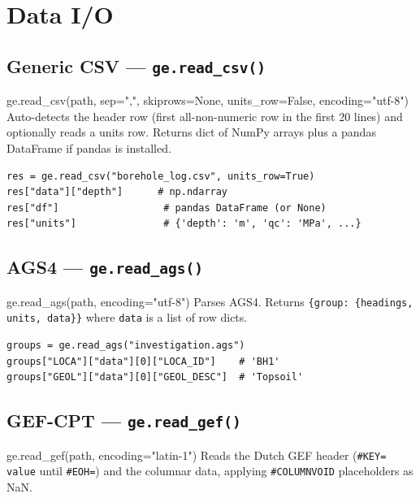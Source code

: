 \documentclass[11pt,a4paper,openany]{book}
\begin{document}
\chapter{Data I/O}\label{ch:io}

\section{Generic CSV --- \texttt{ge.read\_csv()}}

\begin{funcbox}{ge.read\_csv(path, sep=",", skiprows=None, units\_row=False, encoding="utf-8")}
Auto-detects the header row (first all-non-numeric row in the
first 20 lines) and optionally reads a units row. Returns dict
of NumPy arrays plus a pandas DataFrame if pandas is installed.
\end{funcbox}

\begin{lstlisting}
res = ge.read_csv("borehole_log.csv", units_row=True)
res["data"]["depth"]      # np.ndarray
res["df"]                  # pandas DataFrame (or None)
res["units"]               # {'depth': 'm', 'qc': 'MPa', ...}
\end{lstlisting}

\section{AGS4 --- \texttt{ge.read\_ags()}}

\begin{funcbox}{ge.read\_ags(path, encoding="utf-8")}
Parses AGS4. Returns
\texttt{\{group: \{headings, units, data\}\}} where \texttt{data}
is a list of row dicts.
\end{funcbox}

\begin{lstlisting}
groups = ge.read_ags("investigation.ags")
groups["LOCA"]["data"][0]["LOCA_ID"]    # 'BH1'
groups["GEOL"]["data"][0]["GEOL_DESC"]  # 'Topsoil'
\end{lstlisting}

\section{GEF-CPT --- \texttt{ge.read\_gef()}}

\begin{funcbox}{ge.read\_gef(path, encoding="latin-1")}
Reads the Dutch GEF header (\texttt{\#KEY= value} until
\texttt{\#EOH=}) and the columnar data, applying
\texttt{\#COLUMNVOID} placeholders as NaN.
\end{funcbox}
\end{document}
